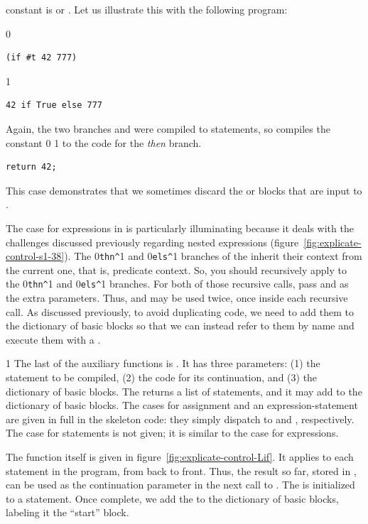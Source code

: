 \documentclass[7x10]{TimesAPriori_MIT}%
\def\racketEd{0}
\def\pythonEd{1}
\def\edition{1}
\newcommand{\racket}[1]{{\if\edition\racketEd{#1}\fi}}
\newcommand{\pythonColor}[0]{}
\newcommand{\python}[1]{{\if\edition\pythonEd\pythonColor #1\fi}}
\numberwithin{theorem}{chapter}
\numberwithin{definition}{chapter}
\numberwithin{equation}{chapter}
\begin{document}
constant is \TRUE{} or \FALSE{}. Let us illustrate this with the
following program:
{\if\edition\racketEd
\begin{lstlisting}
(if #t 42 777)
\end{lstlisting}
\fi}
{\if\edition\pythonEd\pythonColor
\begin{lstlisting}
42 if True else 777
\end{lstlisting}
\fi}
%
\noindent Again, the two branches  and  were
compiled to  statements, so 
compiles the constant \racket{} \python{} to the
code for the \emph{then} branch.
\begin{lstlisting}
return 42;
\end{lstlisting}
This case demonstrates that we sometimes discard the  or
 blocks that are input to .

The case for  expressions in  is
particularly illuminating because it deals with the challenges
discussed previously regarding nested  expressions
(figure~\ref{fig:explicate-control-s1-38}).  The
\racket{\lstinline{thn^}}\python{} and
\racket{\lstinline{els^}}\python{} branches of the
 inherit their context from the current one, that is,
predicate context. So, you should recursively apply
 to the
\racket{\lstinline{thn^}}\python{} and
\racket{\lstinline{els^}}\python{} branches. For both of
those recursive calls, pass  and  as the extra
parameters. Thus,  and  may be used twice, once
inside each recursive call. As discussed previously, to avoid
duplicating code, we need to add them to the dictionary of basic
blocks so that we can instead refer to them by name and execute them
with a .

{\if\edition\pythonEd\pythonColor
%
The last of the auxiliary functions is .  It has
three parameters: (1) the statement to be compiled, (2) the code for its
continuation, and (3) the dictionary of basic blocks. The
 returns a list of statements, and it may add to
the dictionary of basic blocks. The cases for assignment and an
expression-statement are given in full in the skeleton code: they
simply dispatch to  and
, respectively. The case for 
statements is not given; it is similar to the case for 
expressions.

The  function itself is given in
figure~\ref{fig:explicate-control-Lif}. It applies
 to each statement in the program, from back to
front. Thus, the result so far, stored in , can be
used as the continuation parameter in the next call to
. The  is initialized to a
 statement. Once complete, we add the  to
the dictionary of basic blocks, labeling it the ``start'' block.
%
\fi}
\end{document}
